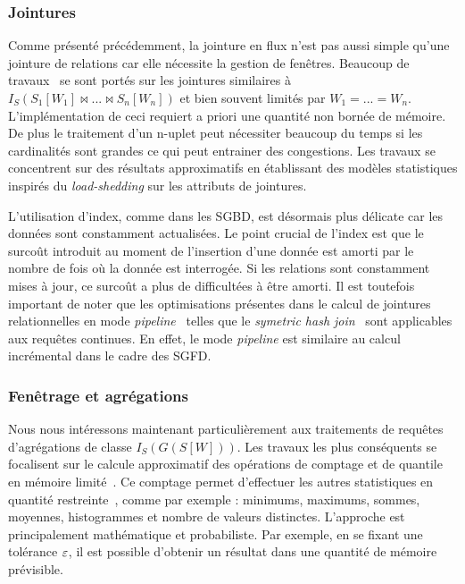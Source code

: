 \subsubsection{Jointures}
Comme présenté précédemment, la jointure en flux n'est pas aussi simple qu'une jointure de relations car elle nécessite la gestion de fenêtres. Beaucoup de travaux~\cite{Han:join, Srivastava:join, Law:join} se sont portés sur les jointures similaires à $I_S (S_1[W_1] \Join ... \Join S_n[W_n])$ et bien souvent limités par $W_1=...=W_n$. L'implémentation de ceci requiert a priori une quantité non bornée de mémoire. De plus le traitement d'un n-uplet peut nécessiter beaucoup du temps si les cardinalités sont grandes ce qui peut entrainer des congestions. Les travaux se concentrent sur des résultats approximatifs en établissant des modèles statistiques inspirés du \textit{load-shedding} sur les attributs de jointures.

L'utilisation d'index, comme dans les SGBD, est désormais plus délicate car les données sont constamment actualisées. Le point crucial de l'index est que le surcoût introduit au moment de l'insertion d'une donnée est amorti par le nombre de fois où la donnée est interrogée. Si les relations sont constamment mises à jour, ce surcoût a plus de difficultées à être amorti. Il est toutefois important de noter que les optimisations présentes dans le calcul de jointures relationnelles en mode \textit{pipeline}~\cite{Gajski:pipeline} telles que le \textit{symetric hash join}~\cite{Wilschut:symetricjoin} sont applicables aux requêtes continues. En effet, le mode \textit{pipeline} est similaire au calcul incrémental dans le cadre des SGFD.

\subsubsection{Fenêtrage et agrégations}
Nous nous intéressons maintenant particulièrement aux traitements de requêtes d'agrégations de classe $I_S(G(S[W]))$. Les travaux les plus conséquents se focalisent sur le calcule approximatif des opérations de comptage et de quantile en mémoire limité~\cite{Arasu:window}. Ce comptage permet d'effectuer les autres statistiques en quantité restreinte~\cite{Datar:stats}, comme par exemple : minimums, maximums, sommes, moyennes, histogrammes et nombre de valeurs distinctes. L'approche est principalement mathématique et probabiliste. Par exemple, en se fixant une tolérance $\varepsilon$, il est possible d'obtenir un résultat dans une quantité de mémoire prévisible. 

